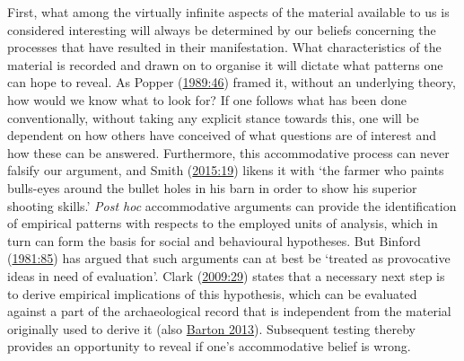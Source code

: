 \documentclass[
  12pt,
  a4paper,
  oneside]{book}
\begin{document}
First, what among the virtually infinite aspects of the material available to us is considered interesting will always be determined by our beliefs concerning the processes that have resulted in their manifestation. What characteristics of the material is recorded and drawn on to organise it will dictate what patterns one can hope to reveal. As Popper (\protect\hyperlink{ref-popper1989}{1989:46}) framed it, without an underlying theory, how would we know what to look for? If one follows what has been done conventionally, without taking any explicit stance towards this, one will be dependent on how others have conceived of what questions are of interest and how these can be answered. Furthermore, this accommodative process can never falsify our argument, and Smith (\protect\hyperlink{ref-smith2015}{2015:19}) likens it with `the farmer who paints bulls-eyes around the bullet holes in his barn in order to show his superior shooting skills.' \emph{Post hoc} accommodative arguments can provide the identification of empirical patterns with respects to the employed units of analysis, which in turn can form the basis for social and behavioural hypotheses. But Binford (\protect\hyperlink{ref-binford1981}{1981:85}) has argued that such arguments can at best be `treated as provocative ideas in need of evaluation'. Clark (\protect\hyperlink{ref-clark2009}{2009:29}) states that a necessary next step is to derive empirical implications of this hypothesis, which can be evaluated against a part of the archaeological record that is independent from the material originally used to derive it (also \protect\hyperlink{ref-barton2013}{Barton 2013}). Subsequent testing thereby provides an opportunity to reveal if one's accommodative belief is wrong.
\end{document}
